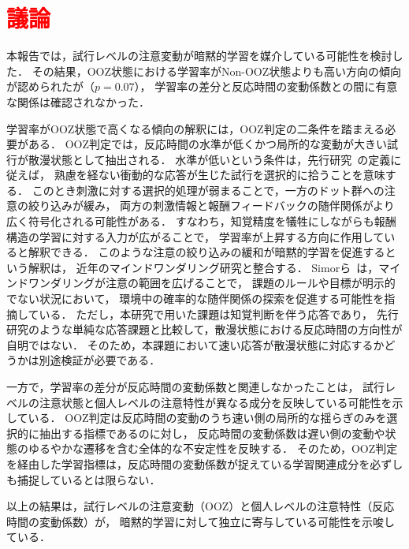 \documentclass[dvipdfmx]{jsarticle}
\begin{document}
\section{\textcolor{red}{議論}}
本報告では，試行レベルの注意変動が暗黙的学習を媒介している可能性を検討した．
その結果，OOZ状態における学習率がNon-OOZ状態よりも高い方向の傾向が認められたが（$p = 0.07$），
学習率の差分と反応時間の変動係数との間に有意な関係は確認されなかった．

学習率がOOZ状態で高くなる傾向の解釈には，OOZ判定の二条件を踏まえる必要がある．
OOZ判定では，反応時間の水準が低くかつ局所的な変動が大きい試行が散漫状態として抽出される．
水準が低いという条件は，先行研究~\cite{decker2023pay}の定義に従えば，
熟慮を経ない衝動的な応答が生じた試行を選択的に拾うことを意味する．
このとき刺激に対する選択的処理が弱まることで，一方のドット群への注意の絞り込みが緩み，
両方の刺激情報と報酬フィードバックの随伴関係がより広く符号化される可能性がある．
すなわち，知覚精度を犠牲にしながらも報酬構造の学習に対する入力が広がることで，
学習率が上昇する方向に作用していると解釈できる．
このような注意の絞り込みの緩和が暗黙的学習を促進するという解釈は，
近年のマインドワンダリング研究と整合する．
Simorら~\cite{simor2025mind}は，マインドワンダリングが注意の範囲を広げることで，
課題のルールや目標が明示的でない状況において，
環境中の確率的な随伴関係の探索を促進する可能性を指摘している．
ただし，本研究で用いた課題は知覚判断を伴う応答であり，
先行研究のような単純な応答課題と比較して，散漫状態における反応時間の方向性が自明ではない．
そのため，本課題において速い応答が散漫状態に対応するかどうかは別途検証が必要である．

一方で，学習率の差分が反応時間の変動係数と関連しなかったことは，
試行レベルの注意状態と個人レベルの注意特性が異なる成分を反映している可能性を示している．
OOZ判定は反応時間の変動のうち速い側の局所的な揺らぎのみを選択的に抽出する指標であるのに対し，
反応時間の変動係数は遅い側の変動や状態のゆるやかな遷移を含む全体的な不安定性を反映する．
そのため，OOZ判定を経由した学習指標は，反応時間の変動係数が捉えている学習関連成分を必ずしも捕捉しているとは限らない．

以上の結果は，試行レベルの注意変動（OOZ）と個人レベルの注意特性（反応時間の変動係数）が，
暗黙的学習に対して独立に寄与している可能性を示唆している．

\clearpage


\end{document}
